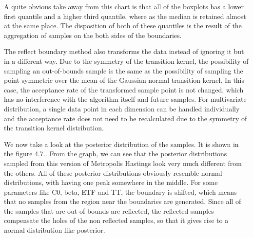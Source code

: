 A quite obvious take away from this chart is that all of the boxplots has a lower first quantile and a higher third quantile, where as the median is retained almost at the same place. The disposition of both of these quantiles is the result of the aggregation of samples on the both sides of the boundaries.

The reflect boundary method also transforms the data instead of ignoring it but in a different way. Due to the symmetry of the transition kernel, the possibility of sampling an out-of-bounds sample is the same as the possibility of sampling the point symmetric over the mean of the Gaussian normal transition kernel.\cite{gaussian_distribution_property} In this case, the acceptance rate of the transformed sample point is not changed, which has no interference with the algorithm itself and future samples. For multivariate distribution, a single data point in each dimension can be handled individually and the acceptance rate does not need to be recalculated due to the symmetry of the transition kernel distribution. 

We now take a look at the posterior distribution of the samples. It is shown in the figure 4.7.. From the graph, we can see  that the posterior distributions sampled from this version of Metropolis Hastings look very much different from the others. All of these posterior distributions obviously resemble normal distributions, with having one peak somewhere in the middle. For some parameters like C0, beta, ETF and TT, the boundary is shifted, which means that no samples from the region near the boundaries are generated. Since all of the samples that are out of bounds are reflected, the reflected samples compensate the holes of the non reflected samples, so that it gives rise to a normal distribution like posterior.

